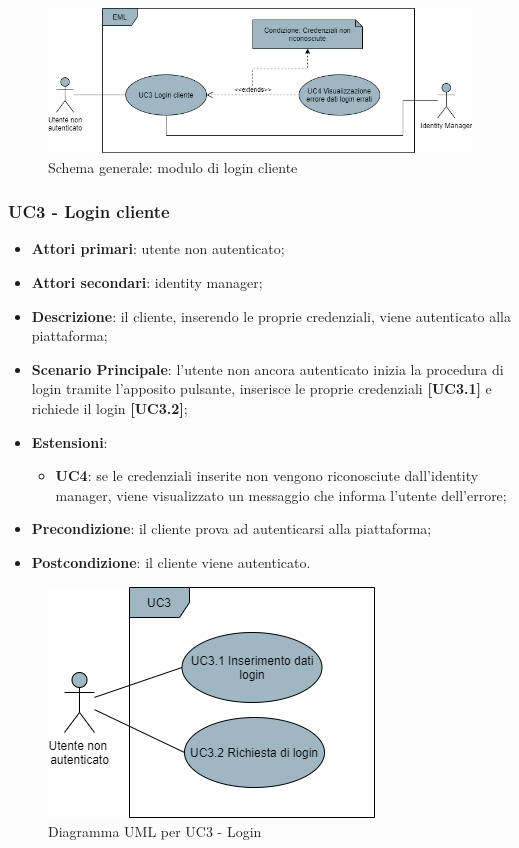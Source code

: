 \begin{figure}[H]
\centering
\includegraphics[scale=0.6]{res/UseCase/Immagini/LoginCliente}
\caption{Schema generale: modulo di login cliente}
\end{figure}

\subsubsection{UC3 - Login cliente}
\begin{itemize}
\item \textbf{Attori primari}: utente non autenticato;
\item \textbf{Attori secondari}: identity manager;
\item \textbf{Descrizione}: il cliente, inserendo le proprie credenziali, viene autenticato alla piattaforma;
\item \textbf{Scenario Principale}: l'utente non ancora autenticato inizia la procedura di login tramite l'apposito pulsante, inserisce le proprie credenziali \textbf{[UC3.1]} e richiede il login \textbf{[UC3.2]};
\item \textbf{Estensioni}:
\begin{itemize}
	\item \textbf{UC4}: se le credenziali inserite non vengono riconosciute dall'identity manager, viene visualizzato un messaggio che informa l'utente dell'errore;
\end{itemize}
\item \textbf{Precondizione}: il cliente prova ad autenticarsi alla piattaforma;
\item \textbf{Postcondizione}: il cliente viene autenticato.
\end{itemize}

\begin{figure}[H]
\centering
\includegraphics[scale=0.6]{res/UseCase/Immagini/LoginClienteSottocasi}
\caption{Diagramma UML per UC3 - Login}
\end{figure}

